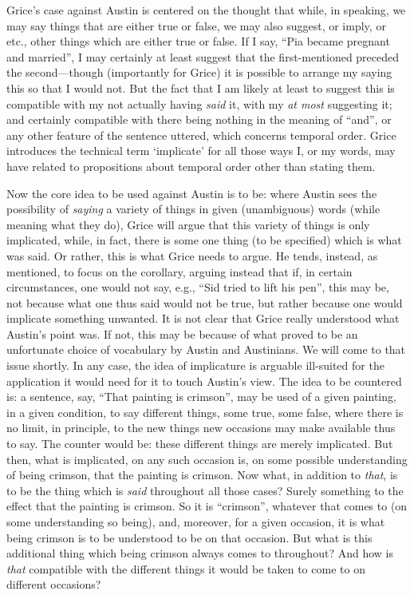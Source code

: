 Grice's case against Austin is centered on the thought that while, in speaking, we may say things that are either true or false, we may also suggest, or imply, or etc., other things which are either true or false. If I say, ``Pia became pregnant and married'', I may certainly at least suggest that the first-mentioned preceded the second---though (importantly for Grice) it is possible to arrange my saying this so that I would not. But the fact that I am likely at least to suggest this is compatible with my not actually having \emph{said} it, with my \emph{at most} suggesting it; and certainly compatible with there being nothing in the meaning of ``and'', or any other feature of the sentence uttered, which concerns temporal order. Grice introduces the technical term ‘implicate’ for all those ways I, or my words, may have related to propositions about temporal order other than stating them.

Now the core idea to be used against Austin is to be: where Austin sees the possibility of \emph{saying} a variety of things in given (unambiguous) words (while meaning what they do), Grice will argue that this variety of things is only implicated, while, in fact, there is some one thing (to be specified) which is what was said. Or rather, this is what Grice needs to argue. He tends, instead, as mentioned, to focus on the corollary, arguing instead that if, in certain circumstances, one would not say, e.g., ``Sid tried to lift his pen'', this may be, not because what one thus said would not be true, but rather because one would implicate something unwanted. It is not clear that Grice really understood what Austin’s point was. If not, this may be because of what proved to be an unfortunate choice of vocabulary by Austin and Austinians. We will come to that issue shortly. In any case, the idea of implicature is arguable ill-suited for the application it would need for it to touch Austin's view. The idea to be countered is: a sentence, say, ``That painting is crimson'', may be used of a given painting, in a given condition, to say different things, some true, some false, where there is no limit, in principle, to the new things new occasions may make available thus to say. The counter would be: these different things are merely implicated. But then, what is implicated, on any such occasion is, on some possible understanding of being crimson, that the painting is crimson. Now what, in addition to \emph{that}, is to be the thing which is \emph{said} throughout all those cases? Surely something to the effect that the painting is crimson. So it is ``crimson'', whatever that comes to (on some understanding so being), and, moreover, for a given occasion, it is what being crimson is to be understood to be on that occasion. But what is this additional thing which being crimson always comes to throughout? And how is \emph{that} compatible with the different things it would be taken to come to on different occasions?

